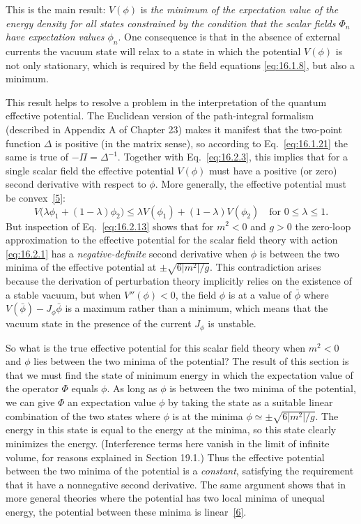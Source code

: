 This is the main result: $V(\phi)$ is \emph{the minimum of the expectation value of the energy density for all states constrained by the condition that the scalar fields $\Phi_n$ have expectation values $\phi_n$}. One consequence is that in the absence of external currents the vacuum state will relax to a state in which the potential $V(\phi)$ is not only stationary, which is required by the field equations \eqref{eq:16.1.8}, but also a minimum.

This result helps to resolve a problem in the interpretation of the quantum effective potential. The Euclidean version of the path-integral formalism (described in Appendix A of Chapter 23) makes it manifest that the two-point function $\Delta$ is positive (in the matrix sense), so according to Eq.~\eqref{eq:16.1.21} the same is true of $-\Pi=\Delta^{-1}$. Together with Eq.~\eqref{eq:16.2.3}, this implies that for a single scalar field the effective potential $V(\phi)$ must have a positive (or zero) second derivative with respect to $\phi$. More generally, the effective potential must be convex~\hyperref[ch16-ref-5]{[5]}:
\[
V\bigl(\lambda\phi_1+(1-\lambda)\phi_2\bigr)
\leq \lambda V(\phi_1)+(1-\lambda)V(\phi_2)
\quad\text{for }0\leq\lambda\leq1.
\]
But inspection of Eq.~\eqref{eq:16.2.13} shows that for $m^2<0$ and $g>0$ the zero-loop approximation to the effective potential for the scalar field theory with action \eqref{eq:16.2.1} has a \emph{negative-definite} second derivative when $\phi$ is between the two minima of the effective potential at $\pm\sqrt{6\lvert m^2\rvert/g}$. This contradiction arises because the derivation of perturbation theory implicitly relies on the existence of a stable vacuum, but when $V''(\phi)<0$, the field $\phi$ is at a value of $\bar\phi$ where $V(\bar\phi)-J_\phi\bar\phi$ is a maximum rather than a minimum, which means that the vacuum state in the presence of the current $J_\phi$ is unstable.

So what is the true effective potential for this scalar field theory when $m^2<0$ and $\phi$ lies between the two minima of the potential? The result of this section is that we must find the state of minimum energy in which the expectation value of the operator $\Phi$ equals $\phi$. As long as $\phi$ is between the two minima of the potential, we can give $\Phi$ an expectation value $\phi$ by taking the state as a suitable linear combination of the two states where $\phi$ is at the minima $\phi\simeq\pm\sqrt{6\lvert m^2\rvert/g}$. The energy in this state is equal to the energy at the minima, so this state clearly minimizes the energy. (Interference terms here vanish in the limit of infinite volume, for reasons explained in Section 19.1.) Thus the effective potential between the two minima of the potential is a \emph{constant}, satisfying the requirement that it have a nonnegative second derivative. The same argument shows that in more general theories where the potential has two local minima of unequal energy, the potential between these minima is linear~\hyperref[ch16-ref-6]{[6]}.
